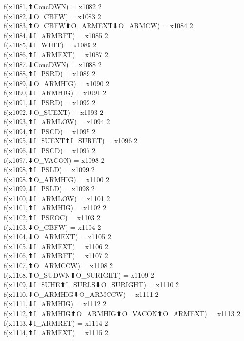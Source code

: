 f(x1081,⬆ConcDWN) = x1082 {2} \\
f(x1082,⬇O_CBFW) = x1083 {2} \\
f(x1083,⬆O_CBFW⬆O_ARMEXT⬇O_ARMCW) = x1084 {2} \\
f(x1084,⬇I_ARMRET) = x1085 {2} \\
f(x1085,⬇I_WHIT) = x1086 {2} \\
f(x1086,⬆I_ARMEXT) = x1087 {2} \\
f(x1087,⬇ConcDWN) = x1088 {2} \\
f(x1088,⬆I_PSRD) = x1089 {2} \\
f(x1089,⬇O_ARMHIG) = x1090 {2} \\
f(x1090,⬇I_ARMHIG) = x1091 {2} \\
f(x1091,⬇I_PSRD) = x1092 {2} \\
f(x1092,⬇O_SUEXT) = x1093 {2} \\
f(x1093,⬆I_ARMLOW) = x1094 {2} \\
f(x1094,⬆I_PSCD) = x1095 {2} \\
f(x1095,⬇I_SUEXT⬆I_SURET) = x1096 {2} \\
f(x1096,⬇I_PSCD) = x1097 {2} \\
f(x1097,⬇O_VACON) = x1098 {2} \\
f(x1098,⬆I_PSLD) = x1099 {2} \\
f(x1098,⬆O_ARMHIG) = x1100 {2} \\
f(x1099,⬇I_PSLD) = x1098 {2} \\
f(x1100,⬇I_ARMLOW) = x1101 {2} \\
f(x1101,⬆I_ARMHIG) = x1102 {2} \\
f(x1102,⬆I_PSEOC) = x1103 {2} \\
f(x1103,⬇O_CBFW) = x1104 {2} \\
f(x1104,⬇O_ARMEXT) = x1105 {2} \\
f(x1105,⬇I_ARMEXT) = x1106 {2} \\
f(x1106,⬆I_ARMRET) = x1107 {2} \\
f(x1107,⬆O_ARMCCW) = x1108 {2} \\
f(x1108,⬆O_SUDWN⬆O_SURIGHT) = x1109 {2} \\
f(x1109,⬇I_SUHE⬆I_SURLS⬇O_SURIGHT) = x1110 {2} \\
f(x1110,⬇O_ARMHIG⬇O_ARMCCW) = x1111 {2} \\
f(x1111,⬇I_ARMHIG) = x1112 {2} \\
f(x1112,⬆I_ARMHIG⬆O_ARMHIG⬆O_VACON⬆O_ARMEXT) = x1113 {2} \\
f(x1113,⬇I_ARMRET) = x1114 {2} \\
f(x1114,⬆I_ARMEXT) = x1115 {2} \\
